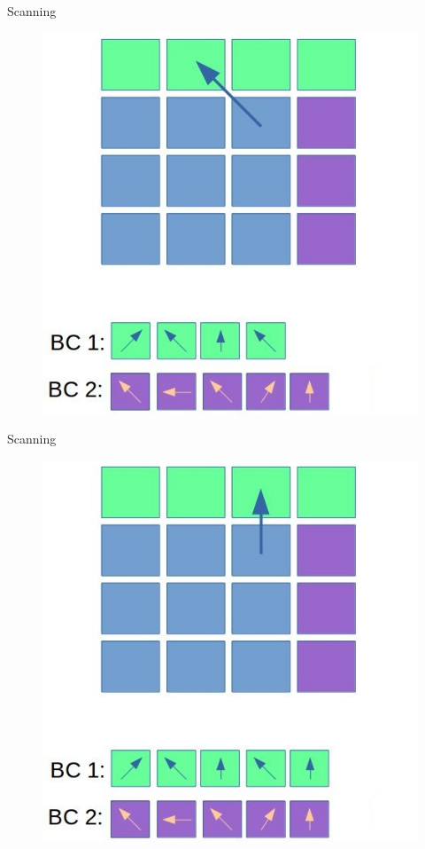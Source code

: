 \documentclass[9pt]{beamer}
\begin{document}
\begin{frame}[t]{Scanning}
\begin{figure}
\includegraphics[scale=0.3]{images/scan-3.jpg}
\centering
\end{figure}
\end{frame}

\begin{frame}[t]{Scanning}
\begin{figure}
\includegraphics[scale=0.3]{images/scan-4.jpg}
\centering
\end{figure}
\end{frame}
\end{document}
